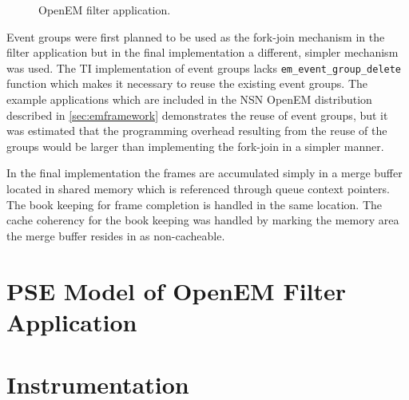 \begin{figure}[h!]
    \label{fig:openem_flow}
    \begin{center}
        
        \caption{OpenEM filter application.}
    \end{center}
\end{figure}

Event groups were first planned to be used as the fork-join mechanism in the
filter application but in the final implementation a different, simpler
mechanism was used. The TI implementation of event groups lacks
\texttt{em\_event\_group\_delete} function which makes it necessary to reuse
the existing event groups. The example applications which are included in the
NSN OpenEM distribution described in \ref{sec:emframework} demonstrates the
reuse of event groups, but it was estimated that the programming overhead
resulting from the reuse of the groups would be larger than implementing the
fork-join in a simpler manner.

In the final implementation the frames are accumulated simply in a merge buffer
located in shared memory which is referenced through queue context pointers. The
book keeping for frame completion is handled in the same location. The cache
coherency for the book keeping was handled by marking the memory area the merge
buffer resides in as non-cacheable.

\section{PSE Model of OpenEM Filter Application}
\section{Instrumentation}
